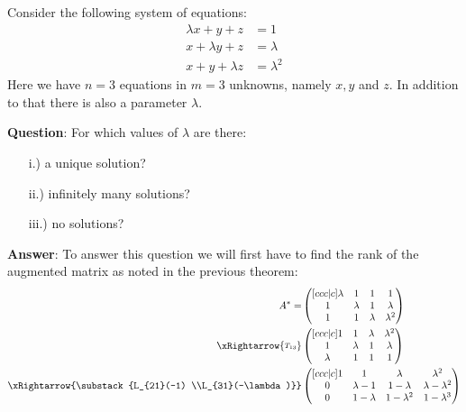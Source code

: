 \begin{exm}\label{exm-rank-of-system}
	Consider the following system of equations:
	\begin{align*}
		\lambda x + y + z & =1          \\
		x + \lambda y + z & = \lambda   \\
		x + y + \lambda z & = \lambda^2
	\end{align*}
	Here we have $n=3$ equations in $m=3$ unknowns, namely $x,y$ and $z$. In
	addition to that there is also a parameter $\lambda$.
	\begin{flushleft}
		\textbf{Question}: For which values of $\lambda$ are there:
		\begin{enumerate}
			\item[i.)] a unique solution?
			\item[ii.)] infinitely many solutions?
			\item[iii.)] no solutions?
		\end{enumerate}
	\end{flushleft}
	\begin{flushleft}
		\textbf{Answer}: To answer this question we will first have to find the
		rank of the augmented matrix as noted in the previous theorem:
		\begin{align}
			A^*=
			 & \begin{pmatrix}[ccc|c]
				\lambda & 1       & 1       & 1         \\
				1       & \lambda & 1       & \lambda   \\
				1       & 1       & \lambda & \lambda^2
			\end{pmatrix}\nonumber      \\
			\xRightarrow{\substack{T_{13}}}
			 & \begin{pmatrix}[ccc|c]
				1       & 1       & \lambda & \lambda^2 \\
				1       & \lambda & 1       & \lambda   \\
				\lambda & 1       & 1       & 1
			\end{pmatrix}\nonumber      \\
			\xRightarrow{\substack{L_{21}(-1)           \\L_{31}(-\lambda)}}
			 & \begin{pmatrix}[ccc|c]
				1 & 1         & \lambda     & \lambda^2         \\
				0 & \lambda-1 & 1-\lambda   & \lambda-\lambda^2 \\
				0 & 1-\lambda & 1-\lambda^2 & 1-\lambda^3
			\end{pmatrix}\nonumber      \\

\end{align}
\end{flushleft}
\end{exm}
